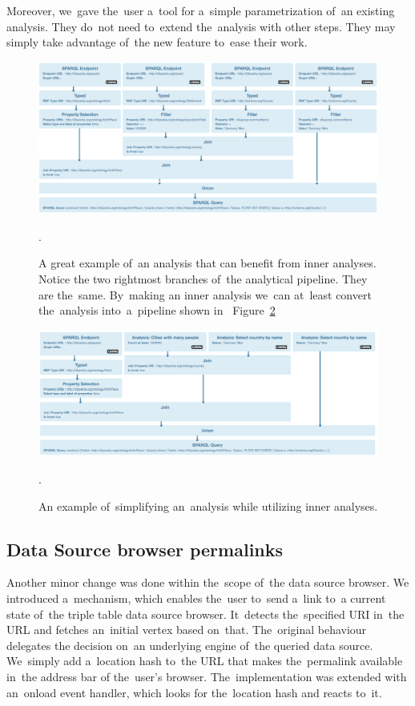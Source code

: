 Moreover, we~gave the~user a~tool for a~simple parametrization of~an existing analysis. 
They do~not need to~extend the~analysis with other steps. They may simply take 
advantage of~the new feature to~ease their work.

\begin{figure}
	\centering
	\includegraphics[width=140mm]{img/inner-example.png}
	\caption{A great example of~an analysis that can benefit from inner analyses. Notice the
	two rightmost branches of~the analytical pipeline. They are the~same. By~making
	an inner analysis we~can at~least convert the~analysis into~a~pipeline shown in~	Figure~\ref{fig:inner-example-simpler}}.
	\label{fig:inner-example}
\end{figure}

\begin{figure}
	\centering
	\includegraphics[width=140mm]{img/inner-example-simpler.png}
	\caption{An example of~simplifying an~analysis while utilizing inner analyses.}.
	\label{fig:inner-example-simpler}
\end{figure}

\subsection{Data Source browser permalinks}
Another minor change was done within the~scope of~the data source browser.
We introduced a~mechanism, which enables the~user to~send a~link to~a current 
state of~the triple table data source browser. It~detects the~specified URI in~the URL and fetches an~initial vertex based on~that. The~original behaviour delegates 
the decision on~an underlying engine of~the queried data source. We~simply add a~location hash to~the URL that makes the~permalink available in~the address bar 
of the~user's browser. The~implementation was extended with an~onload event 
handler, which looks for the~location hash and reacts to~it.

